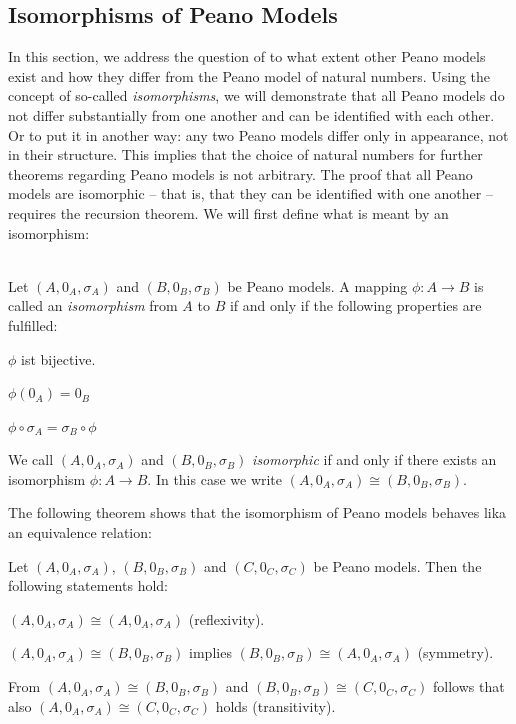 \subsection{Isomorphisms of Peano Models}

In this section, we address the question of to what extent other Peano models exist and how they differ from the Peano model of natural numbers. Using the concept of so-called \emph{isomorphisms}, we will demonstrate that all Peano models do not differ substantially from one another and can be identified with each other. Or to put it in another way: any two Peano models differ only in appearance, not in their structure. This implies that the choice of natural numbers for further theorems regarding Peano models is not arbitrary. The proof that all Peano models are isomorphic -- that is, that they can be identified with one another -- requires the recursion theorem. We will first define what is meant by an isomorphism:

\begin{definition}[Isomorphisms]~\\
    Let $(A,0_A,\sigma_A)$ and $(B,0_B,\sigma_B)$ be Peano models. A mapping $\phi\colon A\rightarrow B$ is called an \emph{isomorphism} from $A$ to $B$ if and only if the following properties are fulfilled:
    \begin{definitionenumerate}[label=(I\arabic*),ref=(I\arabic*)]
        \item $\phi$ ist bijective.
        \item\label{definition:natural_numbers:isomorphism_zero} $\phi(0_A)=0_B$
        \item\label{definition:natural_numbers:isomorphism_successor} $\phi\circ\sigma_A=\sigma_B\circ\phi$
    \end{definitionenumerate}
    We call $(A,0_A,\sigma_A)$ and $(B,0_B,\sigma_B)$ \emph{isomorphic} if and only if there exists an isomorphism $\phi\colon A\rightarrow B$. In this case we write $(A,0_A,\sigma_A)\cong  (B,0_B,\sigma_B)$.
\end{definition}

The following theorem shows that the isomorphism of Peano models behaves lika an equivalence relation:

\begin{theorem}
    Let $(A,0_A,\sigma_A)$, $(B,0_B,\sigma_B)$ and $(C,0_C,\sigma_C)$ be Peano models. Then the following statements hold:
    \begin{intheoremenumerate}
        \item $(A,0_A,\sigma_A)\cong(A,0_A,\sigma_A)$ (reflexivity).
        \item $(A,0_A,\sigma_A)\cong(B,0_B,\sigma_B)$ implies $(B,0_B,\sigma_B)\cong(A,0_A,\sigma_A)$ (symmetry).
        \item From $(A,0_A,\sigma_A)\cong (B,0_B,\sigma_B)$ and $(B,0_B,\sigma_B)\cong(C,0_C,\sigma_C)$ follows that also $(A,0_A,\sigma_A)\cong (C,0_C,\sigma_C)$ holds (transitivity).
    \end{intheoremenumerate}
\end{theorem}

